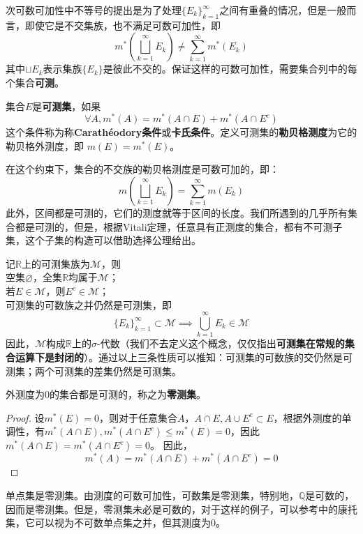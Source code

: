 \documentclass{ctexbook}
\begin{document}
次可数可加性中不等号的提出是为了处理$\{E_k\}_{k=1}^{\infty}$之间有重叠的情况，但是一般而言，即使它是不交集族，也不满足可数可加性，即
$$m^*\left(\bigsqcup_{k=1}^{\infty}E_k\right)\neq\sum_{k=1}^{\infty}m^*(E_k)$$
其中$\sqcup E_k$表示集族$\{E_k\}$是彼此不交的。保证这样的可数可加性，需要集合列中的每个集合\textbf{可测}。

\begin{definition}[可测集]
    集合$E$是\textbf{可测集}，如果
    $$\forall A,m^*(A)=m^*(A\cap E)+m^*(A\cap E^c)$$
    这个条件称为称\textbf{Carathéodory条件}或\textbf{卡氏条件}。定义可测集的\textbf{勒贝格测度}为它的勒贝格外测度，即
    $m(E)=m^*(E)$。
\end{definition}
在这个约束下，集合的不交族的勒贝格测度是可数可加的，即：
\[m\left(\bigsqcup_{k=1}^{\infty}E_k\right)=\sum_{k=1}^{\infty}m(E_k)\]
此外，区间都是可测的，它们的测度就等于区间的长度。我们所遇到的几乎所有集合都是可测的，但是，根据Vitali定理\cite{real_analysis}，任意具有正测度的集合，都有不可测子集，这个子集的构造可以借助选择公理给出。

\begin{proposition}
    记$\mathbb{R}$上的可测集族为$\mathcal{M} $，则\\
    空集$\varnothing $，全集$\mathbb{R}$均属于$\mathcal{M} $；\\
    若$E\in \mathcal{M} $，则$E^c\in \mathcal{M} $；\\
    可测集的可数族之并仍然是可测集，即
    $$\{E_k\}_{k=1}^{\infty}\subset \mathcal{M}\implies\bigcup_{k=1}^{\infty}E_k\in \mathcal{M} $$
    因此，$\mathcal{M} $构成$\mathbb{R}$上的$\sigma$-代数（我们不去定义这个概念，仅仅指出\textbf{可测集在常规的集合运算下是封闭的}）。通过以上三条性质可以推知：可测集的可数族的交仍然是可测集；两个可测集的差集仍然是可测集。
\end{proposition}

\begin{proposition}
    外测度为0的集合都是可测的，称之为\textbf{零测集}。
\end{proposition}
\begin{proof}
    设$m^*(E)=0$，则对于任意集合$A$，$A\cap E,A\cup E^c\subset E$，根据外测度的单调性，有$m^*(A\cap E),m^*(A\cap E^c)\leq m^*(E)=0$，因此$m^*(A\cap E)=m^*(A\cap E^c)=0$。
    因此，
    \[m^*(A)=m^*(A\cap E)+m^*(A\cap E^c)=0\]
\end{proof}

\begin{example}
    单点集是零测集。由测度的可数可加性，可数集是零测集，特别地，$\mathbb{Q}$是可数的，因而是零测集。但是，零测集未必是可数的，对于这样的例子，可以参考\cite{real_analysis}中的康托集，它可以视为不可数单点集之并，但其测度为0。
\end{example}
\end{document}
